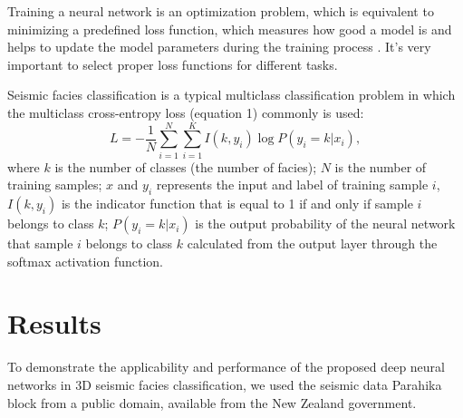 \documentclass[twoside,letterpaper,twocolumn]{article}
\begin{document}
Training a neural network is an optimization problem, which is equivalent to minimizing a predefined loss function, which measures how good a model is and helps to update the model parameters during the training process \citep{liu(2015)}. 
It’s very important to select proper loss functions for different tasks. 

Seismic facies classification is a typical multiclass classification problem in which the multiclass cross-entropy loss (equation 1) commonly is used:
\begin{equation}
 L = - \frac{1}{N} \sum_{i=1}^N \sum_{i=1}^K I(k,y_i)\log P(y_i = k|x_i),
\end{equation}
where $k$ is the number of classes (the number of facies); $N$ is the number of training samples; $x$ and $y_i$ represents the input and label of training sample $i$, $I(k,y_i)$ is the indicator function that is equal to 1 if and only if sample $i$ belongs to class $k$; $P(y_i = k|x_i)$  is the output probability of the neural network that sample $i$ belongs to class $k$ calculated from the output
layer through the softmax activation function.   

\section{Results}

To demonstrate the applicability and performance of the proposed deep neural networks in 3D seismic facies classification, we used the seismic data Parahika block from a public domain, available from the New Zealand government.
\end{document}
